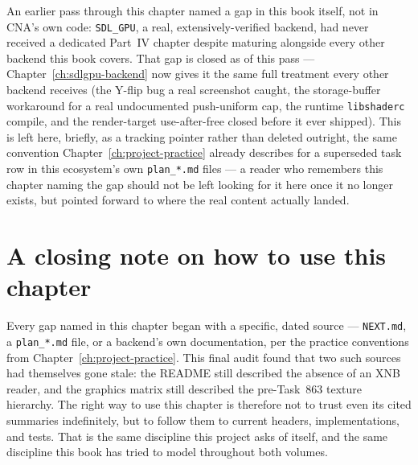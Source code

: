 An earlier pass through this chapter named a gap in this book itself, not in CNA's own code:
\texttt{SDL\_GPU}, a real, extensively-verified backend, had never received a dedicated Part~IV
chapter despite maturing alongside every other backend this book covers. That gap is closed as
of this pass --- Chapter~\ref{ch:sdlgpu-backend} now gives it the same full treatment every
other backend receives (the Y-flip bug a real screenshot caught, the storage-buffer workaround
for a real undocumented push-uniform cap, the runtime \texttt{libshaderc} compile, and the
render-target use-after-free closed before it ever shipped). This is left here, briefly, as a
tracking pointer rather than deleted outright, the same convention
Chapter~\ref{ch:project-practice} already describes for a superseded task row in this
ecosystem's own \texttt{plan\_*.md} files --- a reader who remembers this chapter naming the gap
should not be left looking for it here once it no longer exists, but pointed forward to where
the real content actually landed.

\section{A closing note on how to use this chapter}

Every gap named in this chapter began with a specific, dated source --- \texttt{NEXT.md}, a
\texttt{plan\_*.md} file, or a backend's own documentation, per the practice conventions from
Chapter~\ref{ch:project-practice}. This final audit found that two such sources had themselves
gone stale: the README still described the absence of an XNB reader, and the graphics matrix
still described the pre-Task~863 texture hierarchy. The right way to use this chapter is
therefore not to trust even its cited summaries indefinitely, but to follow them to current
headers, implementations, and tests. That is the same discipline this project asks of itself,
and the same discipline this book has tried to model throughout both volumes.

